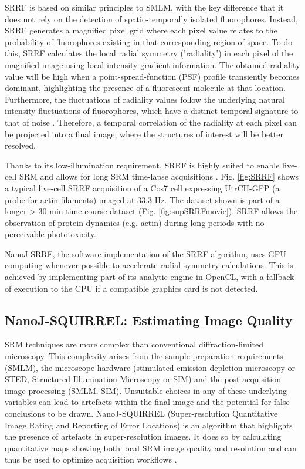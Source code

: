  SRRF is based on similar principles to SMLM, with the key difference that it does not rely on the detection of spatio-temporally isolated fluorophores. Instead, SRRF generates a magnified pixel grid where each pixel value relates to the probability of fluorophores existing in that corresponding region of space. To do this, SRRF calculates the local radial symmetry ('radiality') in each pixel of the magnified image using local intensity gradient information. The obtained radiality value will be high when a point-spread-function (PSF) profile transiently becomes dominant, highlighting the presence of a fluorescent molecule at that location. Furthermore, the fluctuations of radiality values follow the underlying natural intensity fluctuations of fluorophores, which have a distinct temporal signature to that of noise \cite{dertinger2009fast}. Therefore, a temporal correlation of the radiality at each pixel can be projected into a final image, where the structures of interest will be better resolved.

 Thanks to its low-illumination requirement, SRRF is highly suited to enable live-cell SRM and allows for long SRM time-lapse acquisitions \cite{culley2018srrf}. Fig. \ref{fig:SRRF} shows a typical live-cell SRRF acquisition of a Cos7 cell expressing UtrCH-GFP (a probe for actin filaments) imaged at 33.3 Hz. The dataset shown is part of a longer > 30 min time-course dataset (Fig. \ref{fig:supSRRFmovie}). SRRF allows the observation of protein dynamics (e.g. actin) during long periods with no perceivable phototoxicity. 
 
 NanoJ-SRRF, the software implementation of the SRRF algorithm, uses GPU computing whenever possible to accelerate radial symmetry calculations. This is achieved by implementing part of its analytic engine in OpenCL, with a fallback of execution to the CPU if a compatible graphics card is not detected.

\subsection*{NanoJ-SQUIRREL: Estimating Image Quality}
 SRM techniques are more complex than conventional diffraction-limited microscopy. This complexity arises from the sample preparation requirements (SMLM), the microscope hardware (stimulated emission depletion microscopy or STED, Structured Illumination Microscopy or SIM) and the post-acquisition image processing (SMLM, SIM). Unsuitable choices in any of these underlying variables can lead to artefacts within the final image and the potential for false conclusions to be drawn. NanoJ-SQUIRREL (Super-resolution Quantitative Image Rating and Reporting of Error Locations) is an algorithm that highlights the presence of artefacts in super-resolution images. It does so by calculating quantitative maps showing both local SRM image quality and resolution \cite{culley2018quantitative} and can thus be used to optimise acquisition workflows \cite{culley2018srrf}.

